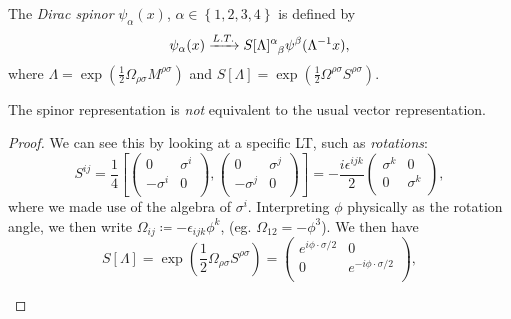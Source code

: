 \begin{definition}[]
  The \emph{Dirac spinor} $\psi_{\alpha}(x)$, $\alpha \in \left\{ 1, 2, 3, 4 \right\}$ is defined by
  \begin{equation}
    \psi_{\alpha}(x) \xrightarrow{L.T.} S[\Lambda] \indices{^{\alpha}_{\beta}} \psi^{\beta}(\Lambda^{-1} x),
  \end{equation}
  where $\Lambda = \exp(\frac{1}{2} \Omega_{\rho\sigma} M^{\rho\sigma})$ and $S[\Lambda] = \exp(\frac{1}{2} \Omega^{\rho\sigma} S^{\rho\sigma})$.
\end{definition}

\begin{claim}
  The spinor representation is \emph{not} equivalent to the usual vector representation.
\end{claim}
\begin{proof}
  We can see this by looking at a specific LT, such as \emph{rotations}:
  \begin{equation}
    S^{ij} = \frac{1}{4} \left[	
      \begin{pmatrix}
       0 & \sigma^i \\
       -\sigma^i & 0 \\
      \end{pmatrix},
      \begin{pmatrix}
       0 & \sigma^j \\
       -\sigma^j & 0 \\
      \end{pmatrix}
    \right]
    = -\frac{i \epsilon^{ijk}}{2} 
    \begin{pmatrix}
     \sigma^k & 0 \\
     0 & \sigma^k \\
    \end{pmatrix},
  \end{equation}
  where we made use of the algebra of $\sigma^i$. Interpreting $\phi$ physically as the rotation angle, we then write $\Omega_{ij} \coloneqq -\epsilon_{ijk} \phi^k$, (eg. $\Omega_{12} = -\phi^3$). We then have
  \begin{equation}
    S[\Lambda] = \exp(\frac{1}{2} \Omega_{\rho\sigma} S^{\rho\sigma}) = 
    \begin{pmatrix}
     e^{i \phi \cdot \sigma/2} & 0 \\
     0 & e^{-i \phi \cdot \sigma /2} \\
    \end{pmatrix},
  \end{equation}
  \begin{leftbar}

\end{leftbar}
\end{proof}
